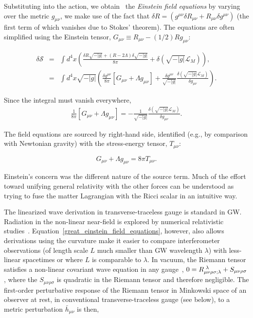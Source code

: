 Substituting into the action, we obtain~\cite{Carroll1997} the \textit{Einstein field equations} by varying over the metric $g_{\mu\nu}$, we make use of the fact that $\delta R = (g^{\mu\nu} \delta R_{\mu\nu} + R_{\mu\nu} \delta g^{\mu\nu})$ (the first term of which vanishes due to Stokes' theorem).
The equations are often simplified using the Einstein tensor, $G_{\mu\nu} \equiv R_{\mu\nu} - (1/2)R g_{\mu\nu}$:

\begin{eqnarray}
\delta \mathcal{S} &=& \int d^4 x \left( \frac{\delta R \sqrt{-|g|} + (R-2\Lambda)\delta \sqrt{-|g|}}{8\pi}+ \delta (\sqrt{-|g|}\mathcal{L}_M)\right), \\
 &=& \int d^4 x \sqrt{-|g|}\left( \frac{\delta g^{\mu\nu}}{8\pi} \left[ G_{\mu\nu} + \Lambda g_{\mu\nu} \right]
 + \frac{\delta g^{\mu \nu}}{\sqrt{-|g|}} \frac{\delta (\sqrt{-|g|}\mathcal{L}_M)}{\delta g_{\mu\nu}} \right).
\end{eqnarray}

\noindent Since the integral must vanish everywhere,
\begin{eqnarray}
\frac{1}{8\pi} \left[G_{\mu\nu} + \Lambda g_{\mu\nu} \right] = -\frac{1}{\sqrt{-|g|}}\frac{\delta (\sqrt{-|g|}\mathcal{L}_M)}{\delta g_{\mu\nu}}.
\end{eqnarray}

\noindent The field equations are sourced by right-hand side, identified (e.g., by comparison with Newtonian gravity) with the stress-energy tensor, $T_{\mu\nu}$:

\begin{equation}
G_{\mu\nu} + \Lambda g_{\mu\nu} = 8 \pi T_{\mu\nu}.
\label{great_einstein_field_equations}
\end{equation}

Einstein's concern was the different nature of the source term.
Much of the effort toward unifying general relativity with the other forces can be understood as trying to fuse the matter Lagrangian with the Ricci scalar in an intuitive way.

The linearized wave derivation in transverse-traceless gauge is standard in GW. 
Radiation in the non-linear near-field is explored by numerical relativistic studies~\cite{FarrThesis}.
Equation~\ref{great_einstein_field_equations}, however, also allows derivations using the curvature make it easier to compare interferometer observations (of length scale $L$ much smaller than GW wavelength $\lambda$) with less-linear spacetimes or where $L$ is comparable to $\lambda$.
In vacuum, the Riemann tensor satisfies a non-linear covariant wave equation in any gauge~\cite{KoopFinn2014}, $0 = R_{\mu \nu \rho \sigma; \lambda}^{\textup{        } \lambda} + S_{\mu \nu \rho \sigma}$, where the $S_{\mu \nu \rho \sigma}$ is quadratic in the Riemann tensor and therefore negligible.
The first-order perturbative response of the Riemann tensor in Minkowski space of an observer at rest, in conventional transverse-traceless gauge (see below), to a metric perturbation $\bar{h}_{\mu\nu}$ is then,

